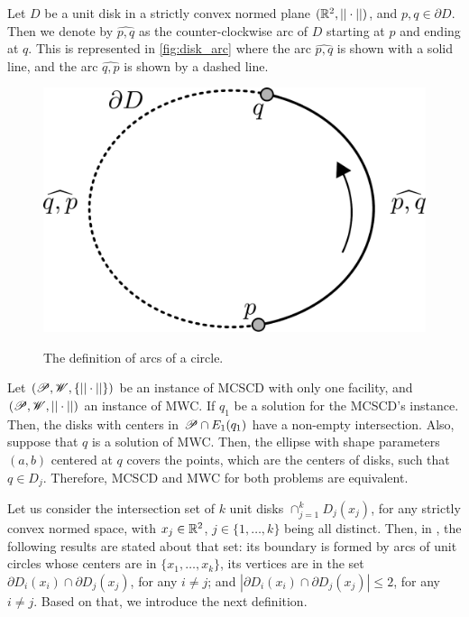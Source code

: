 Let $D$ be a unit disk in a strictly convex normed plane $(\mathbb{R}^2, ||\cdot||)$, and $p, q \in \partial D$. Then we denote by $\widehat{p, q}$ as the counter-clockwise arc of $D$ starting at $p$ and ending at $q$. This is represented in \autoref{fig:disk_arc} where the arc $\widehat{p,q}$ is shown with a solid line, and the arc $\widehat{q, p}$ is shown by a dashed line.

\begin{figure}[!htb]
	\centering
	
	\caption{The definition of arcs of a circle.}
	\includegraphics[scale=.3]{tex/figures/disk_arc.pdf}
	\fautor
	\label{fig:disk_arc}
\end{figure}

Let $(\mathscr{P}, \mathscr{W}, \{||\cdot||\})$ be an instance of MCSCD with only one facility, and $(\mathscr{P}, \mathscr{W}, ||\cdot||)$ an instance of MWC.
If $q_1$ be a solution for the MCSCD's instance. Then, the disks with centers in $\mathscr{P} \cap E_1(q_1)$ have a non-empty intersection.
Also, suppose that $q$ is a solution of MWC. Then, the ellipse with shape parameters $(a, b)$ centered at $q$ covers the points, which are the centers of disks, such that $q \in D_j$.
Therefore, MCSCD and MWC for both problems are equivalent.

Let us consider the intersection set of $k$ unit disks $\cap_{j=1}^k D_j(x_j)$, for any strictly convex normed space, with $x_j \in \mathbb{R}^2$, $j\in \{1, \dots, k\}$ being all distinct.
Then, in , the following results are stated about that set: its boundary is formed by arcs of unit circles whose centers are in $\{x_1, \dots, x_k\}$, its vertices are in the set $\partial D_i(x_i) \cap \partial D_j(x_j)$, for any $i \neq j$; and $|\partial D_i(x_i) \cap \partial D_j(x_j)| \le 2$, for any $i\neq j$. 
Based on that, we introduce the next definition.

